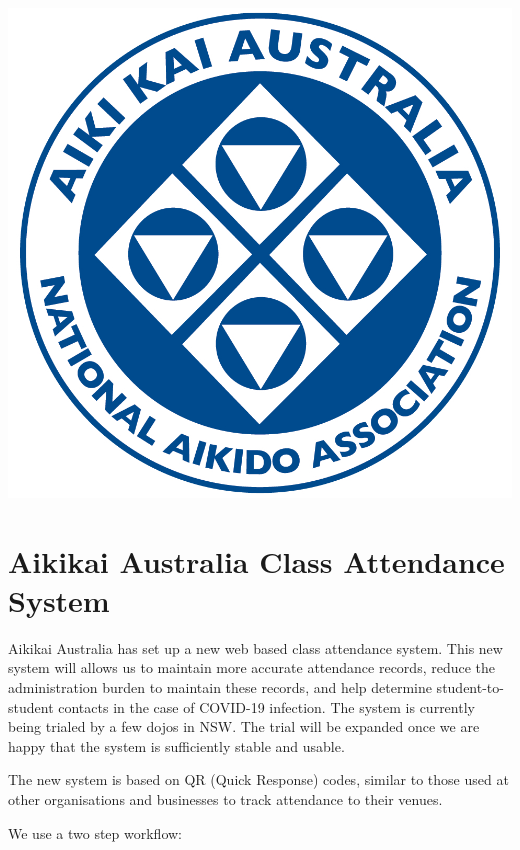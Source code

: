 \documentclass{report}
\begin{document}
\flushleft

\includegraphics[scale=0.08]{figure/logo-aka.jpg}
\section*{Aikikai Australia Class Attendance System}

Aikikai Australia has set up a new web based class attendance system.
This new system will allows us to maintain more accurate attendance records,
reduce the administration burden to maintain these records,
and help determine student-to-student contacts in the case of COVID-19 infection.
The system is currently being trialed by a few dojos in NSW. The trial will
be expanded once we are happy that the system is sufficiently stable and usable.

\smallskip
The new system is based on QR (Quick Response) codes, similar to those used
at other organisations and businesses to track attendance to their venues.

\medskip
We use a two step workflow:
\end{document}
